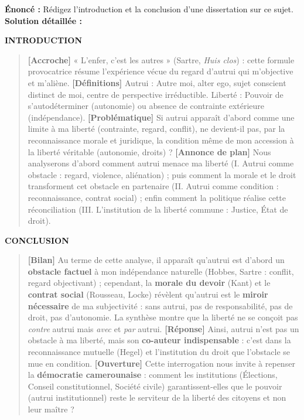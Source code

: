 \documentclass[11pt]{article}
\newcommand{\cle}[1]{{\popxbold\color{popdark}#1}}
\begin{document}
\begin{exoresolu}
\textbf{Énoncé :} Rédigez l'introduction et la conclusion d'une dissertation sur ce sujet.
\tcblower
\textbf{Solution détaillée :}

\textbf{INTRODUCTION}
\begin{quote}
\textbf{[Accroche]} « L'enfer, c'est les autres » (Sartre, \emph{Huis clos}) : cette formule provocatrice résume l'expérience vécue du regard d'autrui qui m'objective et m'aliène.
\textbf{[Définitions]} \cle{Autrui} : Autre moi, alter ego, sujet conscient distinct de moi, centre de perspective irréductible. \cle{Liberté} : Pouvoir de s'autodéterminer (autonomie) ou absence de contrainte extérieure (indépendance).
\textbf{[Problématique]} Si autrui apparaît d'abord comme une \cle{limite} à ma liberté (contrainte, regard, conflit), ne devient-il pas, par la \cle{reconnaissance} morale et juridique, la \cle{condition même} de mon accession à la liberté véritable (autonomie, droits) ?
\textbf{[Annonce de plan]} Nous analyserons d'abord comment autrui menace ma liberté (I. Autrui comme obstacle : regard, violence, aliénation) ; puis comment la morale et le droit transforment cet obstacle en partenaire (II. Autrui comme condition : reconnaissance, contrat social) ; enfin comment la politique réalise cette réconciliation (III. L'institution de la liberté commune : Justice, État de droit).
\end{quote}

\textbf{CONCLUSION}
\begin{quote}
\textbf{[Bilan]} Au terme de cette analyse, il apparaît qu'autrui est d'abord un \textbf{obstacle factuel} à mon indépendance naturelle (Hobbes, Sartre : conflit, regard objectivant) ; cependant, la \textbf{morale du devoir} (Kant) et le \textbf{contrat social} (Rousseau, Locke) révèlent qu'autrui est le \textbf{miroir nécessaire} de ma subjectivité : sans autrui, pas de responsabilité, pas de droit, pas d'autonomie. La synthèse montre que la liberté ne se conçoit pas \emph{contre} autrui mais \emph{avec} et \emph{par} autrui.
\textbf{[Réponse]} Ainsi, autrui n'est pas un obstacle à ma liberté, mais son \textbf{co-auteur indispensable} : c'est dans la reconnaissance mutuelle (Hegel) et l'institution du droit que l'obstacle se mue en condition.
\textbf{[Ouverture]} Cette interrogation nous invite à repenser la \textbf{démocratie camerounaise} : comment les institutions (Élections, Conseil constitutionnel, Société civile) garantissent-elles que le pouvoir (autrui institutionnel) reste le serviteur de la liberté des citoyens et non leur maître ?
\end{quote}
\end{exoresolu}
\end{document}

